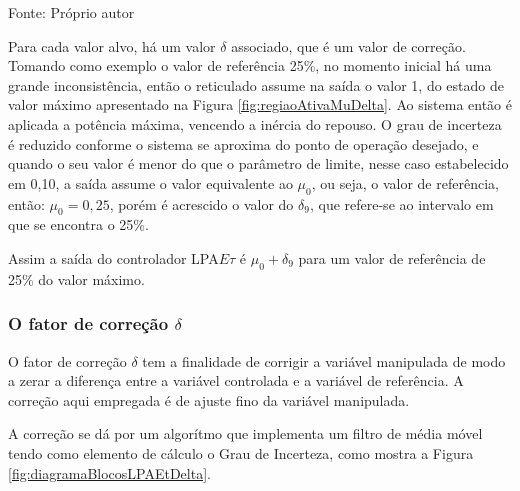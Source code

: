 \begin{table}[h]
\begin{tabular}{c|c|c||c}
\end{tabular}

{\vspace{0.2cm} \small Fonte: Próprio autor}
\end{table}


Para cada valor alvo, há um valor $\delta$ associado, 
que é um valor de correção.
Tomando como exemplo o valor de referência 25\%, 
no momento inicial há uma grande inconsistência,
então o reticulado assume na saída o valor 1, 
do estado de valor máximo apresentado na 
Figura \ref{fig:regiaoAtivaMuDelta}.
Ao sistema então é aplicada a potência máxima, 
vencendo a inércia do repouso.
O grau de incerteza é reduzido conforme 
o sistema se aproxima do ponto de operação desejado,
e quando o seu valor é menor do que 
o parâmetro de limite, nesse caso estabelecido em 0,10,
a saída assume o valor equivalente ao $\mu_0$, ou seja,
o valor de referência, então: $\mu_0 = 0,25$, porém 
é acrescido o valor do $\delta_9$, 
que refere-se ao intervalo em que se encontra o 25\%.

Assim a saída do controlador LPA$E\tau$ é 
$\mu_0 + \delta_9$
para um valor de referência de 25\% do valor máximo.








\newpage
\subsubsection{O fator de correção $\delta$}

O fator de correção $\delta$ tem a finalidade de corrigir a variável
manipulada de modo a zerar a diferença entre a variável controlada e a
variável de referência. A correção aqui empregada é de ajuste fino da
variável manipulada.

A correção se dá por um algorítmo que implementa um filtro de média móvel
tendo como elemento de cálculo o Grau de Incerteza,
como mostra a Figura \ref{fig:diagramaBlocosLPAEtDelta}.



